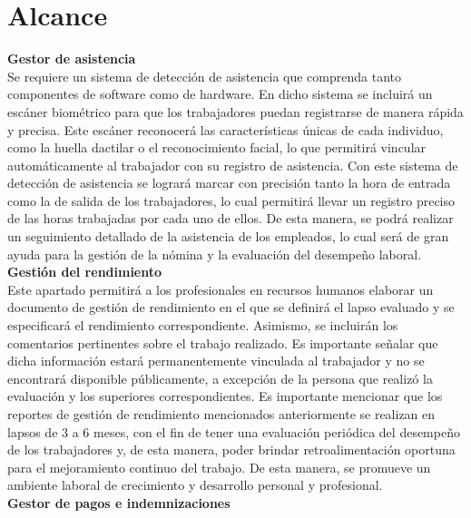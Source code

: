   \section{Alcance}
  \noindent
  \textbf{Gestor de asistencia}
  \\ \newline
  Se requiere un sistema de detección de asistencia que comprenda tanto componentes de software como de hardware. En dicho sistema se incluirá un escáner biométrico para que los trabajadores puedan registrarse de manera rápida y precisa. Este escáner reconocerá las características únicas de cada individuo, como la huella dactilar o el reconocimiento facial, lo que permitirá vincular automáticamente al trabajador con su registro de asistencia. Con este sistema de detección de asistencia se logrará marcar con precisión tanto la hora de entrada como la de salida de los trabajadores, lo cual permitirá llevar un registro preciso de las horas trabajadas por cada uno de ellos. De esta manera, se podrá realizar un seguimiento detallado de la asistencia de los empleados, lo cual será de gran ayuda para la gestión de la nómina y la evaluación del desempeño laboral.
  \\ \newline
  \textbf{Gestión del rendimiento}
  \\ \newline
  Este apartado permitirá a los profesionales en recursos humanos elaborar un documento de gestión de rendimiento en el que se definirá el lapso evaluado y se especificará el rendimiento correspondiente. Asimismo, se incluirán los comentarios pertinentes sobre el trabajo realizado. Es importante señalar que dicha información estará permanentemente vinculada al trabajador y no se encontrará disponible públicamente, a excepción de la persona que realizó la evaluación y los superiores correspondientes. Es importante mencionar que los reportes de gestión de rendimiento mencionados anteriormente se realizan en lapsos de 3 a 6 meses, con el fin de tener una evaluación periódica del desempeño de los trabajadores y, de esta manera, poder brindar retroalimentación oportuna para el mejoramiento continuo del trabajo. De esta manera, se promueve un ambiente laboral de crecimiento y desarrollo personal y profesional.
  \\ \newline
  \textbf{Gestor de pagos e indemnizaciones}
  \\ \newline
